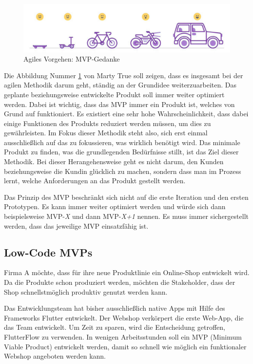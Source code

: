 \documentclass[acmtog, language=ngerman]{acmart}
\begin{document}
\begin{figure}[h]
    \centering
    \includegraphics[width=1\linewidth]{images/mvp_grafik.jpg}
    \caption{Agiles Vorgehen: MVP-Gedanke \cite{mvp_definition}}
    \label{fig:mvp_figure}
\end{figure}
Die Abbildung Nummer \ref{fig:mvp_figure} von Marty True \cite{mvp_definition} soll zeigen, dass es insgesamt bei der agilen Methodik darum geht, ständig an der Grundidee weiterzuarbeiten. Das geplante beziehungsweise entwickelte Produkt soll immer weiter optimiert werden.
Dabei ist wichtig, dass das MVP immer ein Produkt ist, welches von Grund auf funktioniert. Es existiert eine sehr hohe Wahrscheinlichkeit, dass dabei einige Funktionen des Produkts reduziert werden müssen, um dies zu gewährleisten.
Im Fokus dieser Methodik steht also, sich erst einmal ausschließlich auf das zu fokussieren, was wirklich benötigt wird. Das minimale Produkt zu finden, was die grundlegenden Bedürfnisse stillt, ist das Ziel dieser Methodik.
Bei dieser Herangehensweise geht es nicht darum, den Kunden beziehungsweise die Kundin glücklich zu machen, sondern dass man im Prozess lernt, welche Anforderungen an das Produkt gestellt werden.

Das Prinzip des MVP beschränkt sich nicht auf die erste Iteration und den ersten Prototypen. Es kann immer weiter optimiert werden und würde sich dann beispielsweise MVP-\textit{X} und dann MVP-\textit{X+1} nennen. Es muss immer sichergestellt werden, dass das jeweilige MVP einsatzfähig ist.

\subsection{Low-Code MVPs}

Firma A möchte, dass für ihre neue Produktlinie ein Online-Shop entwickelt wird. Da die Produkte schon produziert werden, möchten die Stakeholder, dass der Shop schnellstmöglich produktiv genutzt werden kann.

Das Entwicklungsteam hat bisher ausschließlich native Apps mit Hilfe des Frameworks Flutter entwickelt. Der Webshop verkörpert die erste Web-App, die das Team entwickelt. Um Zeit zu sparen, wird die Entscheidung getroffen, FlutterFlow zu verwenden. In wenigen Arbeitsstunden soll ein MVP (Minimum Viable Product) entwickelt werden, damit so schnell wie möglich ein funktionaler Webshop angeboten werden kann.
\end{document}
